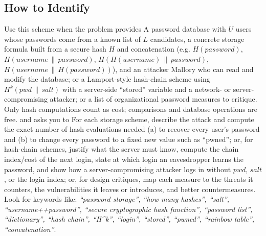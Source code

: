 \documentclass[12pt, a4paper]{article}
\begin{document}
\subsection*{How to Identify}
Use this scheme when the problem provides A password database with $U$ users whose passwords come from a known list of $L$ candidates, a concrete storage formula built from a secure hash $H$ and concatenation (e.g. $H(password)$, $H(username \,\|\, password)$, $H(H(username) \,\|\, password)$, $H(username \,\|\, H(password))$), and an attacker Mallory who can read and modify the database; or a Lamport-style hash-chain scheme using $H^{k}(pwd \,\|\, salt)$ with a server-side ``stored'' variable and a network- or server-compromising attacker; or a list of organizational password measures to critique. Only hash computations count as cost; comparisons and database operations are free. and asks you to For each storage scheme, describe the attack and compute the exact number of hash evaluations needed (a) to recover every user's password and (b) to change every password to a fixed new value such as ``pwned''; or, for hash-chain schemes, justify what the server must know, compute the chain index/cost of the next login, state at which login an eavesdropper learns the password, and show how a server-compromising attacker logs in without $pwd$, $salt$, or the login index; or, for design critiques, map each measure to the threats it counters, the vulnerabilities it leaves or introduces, and better countermeasures. Look for keywords like: \textit{``password storage'', ``how many hashes'', ``salt'', ``username++password'', ``secure cryptographic hash function'', ``password list'', ``dictionary'', ``hash chain'', ``H\textasciicircum k'', ``login'', ``stored'', ``pwned'', ``rainbow table'', ``concatenation''}.
\end{document}
